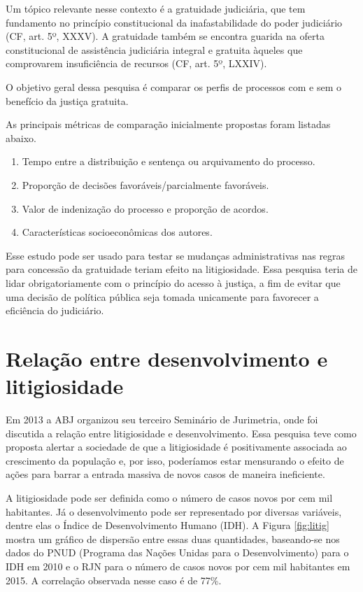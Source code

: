 \documentclass[]{report}
\providecommand{\tightlist}{%
  \setlength{\itemsep}{0pt}\setlength{\parskip}{0pt}}
\begin{document}
Um tópico relevante nesse contexto é a gratuidade judiciária, que tem
fundamento no princípio constitucional da inafastabilidade do poder
judiciário (CF, art. 5º, XXXV). A gratuidade também se encontra guarida
na oferta constitucional de assistência judiciária integral e gratuita
àqueles que comprovarem insuficiência de recursos (CF, art. 5º, LXXIV).

O objetivo geral dessa pesquisa é comparar os perfis de processos com e
sem o benefício da justiça gratuita.

As principais métricas de comparação inicialmente propostas foram
listadas abaixo.

\begin{enumerate}
\def\labelenumi{\arabic{enumi}.}
\tightlist
\item
  Tempo entre a distribuição e sentença ou arquivamento do processo.
\item
  Proporção de decisões favoráveis/parcialmente favoráveis.
\item
  Valor de indenização do processo e proporção de acordos.
\item
  Características socioeconômicas dos autores.
\end{enumerate}

Esse estudo pode ser usado para testar se mudanças administrativas nas
regras para concessão da gratuidade teriam efeito na litigiosidade. Essa
pesquisa teria de lidar obrigatoriamente com o princípio do acesso à
justiça, a fim de evitar que uma decisão de política pública seja tomada
unicamente para favorecer a eficiência do judiciário.

\section{Relação entre desenvolvimento e
litigiosidade}\label{relacao-entre-desenvolvimento-e-litigiosidade}

Em 2013 a ABJ organizou seu terceiro Seminário de Jurimetria, onde foi
discutida a relação entre litigiosidade e desenvolvimento. Essa pesquisa
teve como proposta alertar a sociedade de que a litigiosidade é
positivamente associada ao crescimento da população e, por isso,
poderíamos estar mensurando o efeito de ações para barrar a entrada
massiva de novos casos de maneira ineficiente.

A litigiosidade pode ser definida como o número de casos novos por cem
mil habitantes. Já o desenvolvimento pode ser representado por diversas
variáveis, dentre elas o Índice de Desenvolvimento Humano (IDH). A
Figura \ref{fig:litig} mostra um gráfico de dispersão entre essas duas
quantidades, baseando-se nos dados do PNUD (Programa das Nações Unidas
para o Desenvolvimento) para o IDH em 2010 e o RJN para o número de
casos novos por cem mil habitantes em 2015. A correlação observada nesse
caso é de 77\%.
\end{document}
